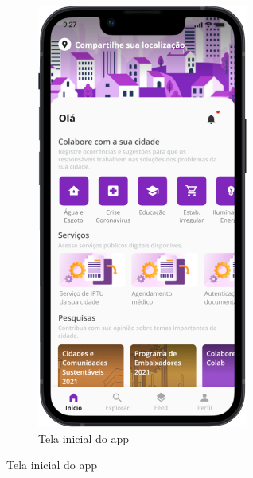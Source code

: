 \begin{figure}[ht]
	\centering
	\begin{subfigure}{0.33\textwidth}
		\centering
		\includegraphics[width=\textwidth]{images/colab_app.png}
		\caption{Tela inicial do app}

\end{subfigure}
\end{figure}
